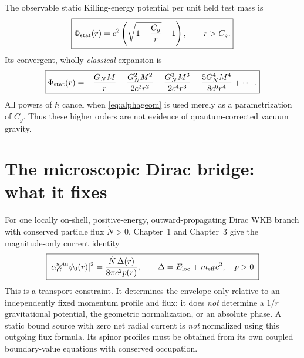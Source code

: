 \documentclass[11pt,a4paper]{article}
\begin{document}
The observable static Killing-energy potential per unit held test
mass is
\begin{equation}\label{eq:pot}
\boxed{\displaystyle\Phi_{\rm stat}(r)=c^2\left(\sqrt{1-\frac{C_g}{r}}-1\right),
\qquad r>C_g.}
\end{equation}
Its convergent, wholly \emph{classical} expansion is
\begin{equation}\label{eq:classseries}
\boxed{\displaystyle\Phi_{\rm stat}(r)=-\frac{G_NM}{r}
-\frac{G_N^2M^2}{2c^2r^2}
-\frac{G_N^3M^3}{2c^4r^3}
-\frac{5G_N^4M^4}{8c^6r^4}+\cdots .}
\end{equation}
All powers of $\hbar$ cancel when \eqref{eq:alphageom} is used
merely as a parametrization of $C_g$. Thus these higher orders are
not evidence of quantum-corrected vacuum gravity.

\section{The microscopic Dirac bridge: what it fixes}\label{sec:bridge}
For one locally on-shell, positive-energy, outward-propagating Dirac
WKB branch with conserved particle flux $\dot N>0$, Chapter~1 and
Chapter~3 give the magnitude-only current identity
\begin{equation}\label{eq:fluxbridge}
\boxed{\displaystyle |\alpha_G^{\rm spin}\psi_0(r)|^2
=\frac{\dot N\,\Delta(r)}{8\pi c^2p(r)},\qquad
\Delta=E_{\rm loc}+m_{\rm eff}c^2,\quad p>0.}
\end{equation}
This is a transport constraint. It determines the envelope only
relative to an independently fixed momentum profile and flux; it does
\emph{not} determine a $1/r$ gravitational potential, the geometric
normalization, or an absolute phase. A static bound source with
zero net radial current is \emph{not} normalized using this outgoing
flux formula. Its spinor profiles must be obtained from its own
coupled boundary-value equations with conserved occupation.
\end{document}
